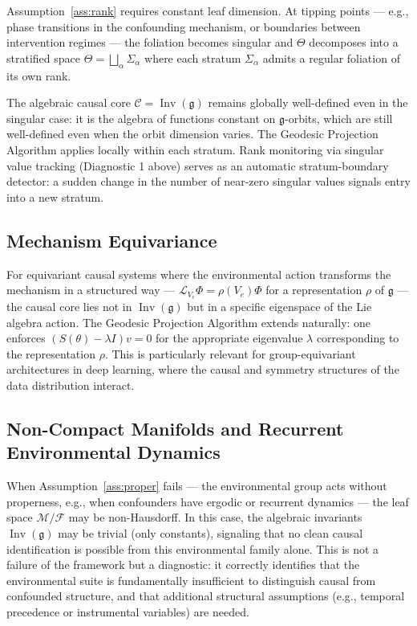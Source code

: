 \documentclass[11pt,a4paper]{article}
\DeclareMathOperator{\Inv}{Inv}
\newcommand{\g}{\mathfrak{g}}
\newcommand{\cC}{\mathcal{C}}
\newcommand{\cM}{\mathcal{M}}
\newcommand{\cF}{\mathcal{F}}
\newcommand{\LP}{\mathcal{L}}
\begin{document}
Assumption~\ref{ass:rank} requires constant leaf dimension. At tipping points — e.g., phase transitions in the confounding mechanism, or boundaries between intervention regimes — the foliation becomes singular and $\Theta$ decomposes into a stratified space $\Theta = \bigsqcup_\alpha \Sigma_\alpha$ where each stratum $\Sigma_\alpha$ admits a regular foliation of its own rank.

The algebraic causal core $\cC = \Inv(\g)$ remains globally well-defined even in the singular case: it is the algebra of functions constant on $\g$-orbits, which are still well-defined even when the orbit dimension varies. The Geodesic Projection Algorithm applies locally within each stratum. Rank monitoring via singular value tracking (Diagnostic 1 above) serves as an automatic stratum-boundary detector: a sudden change in the number of near-zero singular values signals entry into a new stratum.

\subsection{Mechanism Equivariance}

For equivariant causal systems where the environmental action transforms the mechanism in a structured way — $\LP_{V_e} \Phi = \rho(V_e)\Phi$ for a representation $\rho$ of $\g$ — the causal core lies not in $\Inv(\g)$ but in a specific eigenspace of the Lie algebra action. The Geodesic Projection Algorithm extends naturally: one enforces $(S(\theta) - \lambda I)v = 0$ for the appropriate eigenvalue $\lambda$ corresponding to the representation $\rho$. This is particularly relevant for group-equivariant architectures in deep learning, where the causal and symmetry structures of the data distribution interact.

\subsection{Non-Compact Manifolds and Recurrent Environmental Dynamics}

When Assumption~\ref{ass:proper} fails — the environmental group acts without properness, e.g., when confounders have ergodic or recurrent dynamics — the leaf space $\cM/\cF$ may be non-Hausdorff. In this case, the algebraic invariants $\Inv(\g)$ may be trivial (only constants), signaling that no clean causal identification is possible from this environmental family alone. This is not a failure of the framework but a diagnostic: it correctly identifies that the environmental suite is fundamentally insufficient to distinguish causal from confounded structure, and that additional structural assumptions (e.g., temporal precedence or instrumental variables) are needed.
\end{document}
